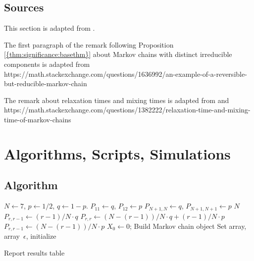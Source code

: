 \documentclass[12pt]{article}
\begin{document}
\subsection*{Sources} This section is adapted from
\cite{Chikina2860, Chikina2019, doi:10.1080/2330443X.2020.1806763}.

The first paragraph of the remark following Proposition~%
\ref{{thm:significance:basethm}} about Markov chains with distinct
irreducible components is adapted from
https://math.stackexchange.com/questions/1636992/an-example-of-a-reversible-but-reducible-markov-chain

The remark about relaxation times and mixing times is adapted from
\cite{levin09} and
https://math.stackexchange.com/questions/1382222/relaxation-time-and-mixing-time-of-markov-chains

\hr

\section*{Algorithms, Scripts, Simulations}

\subsection*{Algorithm}

\begin{algorithm}[H]
     
      
     

     \BlankLine \( N \leftarrow 7 \), \( p \leftarrow 1/2 \),
    \( q \leftarrow 1-p \).\;  \( P_{11} \leftarrow q \), \( P_{12}
    \leftarrow p \)\; \( P_{N+1,N} \leftarrow q \), \( P_{N+1, N+1}
    \leftarrow p \)\;  \KwTo \( N \){ \( P_{r,r-1}
    \leftarrow (r-1)/N \cdot q \)\; \( P_{r,r} \leftarrow (N-(r-1))/N
    \cdot q + (r-1)/N \cdot p \)\; \( P_{r,r-1} \leftarrow (N-(r-1))/N
    \cdot p \)\; }  \( X_0
    \leftarrow 0 \); Build Markov chain object\; \BlankLine Set \pL
    array, \nT array\, \( \epsilon \), initialize \res

     Report results table\;
\end{algorithm}
\end{document}
